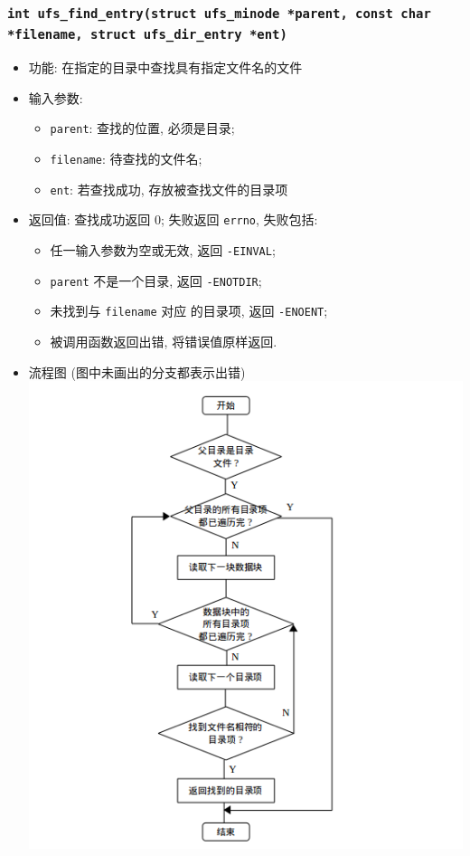 \documentclass[nofonts, titlepage]{ctexart}
\begin{document}
  \subsubsection[\texttt{ufs\_find\_entry}]{\texttt{int ufs\_find\_entry(struct ufs\_minode *parent, const char *filename, struct ufs\_dir\_entry *ent)}}
  \begin{itemize}
\item
  功能: 在指定的目录中查找具有指定文件名的文件
\item
  输入参数:

  \begin{itemize}
  \item
    \texttt{parent}: 查找的位置, 必须是目录;
  \item
    \texttt{filename}: 待查找的文件名;
  \item
    \texttt{ent}: 若查找成功, 存放被查找文件的目录项
  \end{itemize}
\item
  返回值: 查找成功返回 0; 失败返回 \texttt{errno}, 失败包括:

  \begin{itemize}
  \item
    任一输入参数为空或无效, 返回 \texttt{-EINVAL};
  \item
    \texttt{parent} 不是一个目录, 返回 \texttt{-ENOTDIR};
  \item
    未找到与 \texttt{filename} 对应 的目录项, 返回 \texttt{-ENOENT};
  \item
    被调用函数返回出错, 将错误值原样返回.
  \end{itemize}
\item
  流程图 (图中未画出的分支都表示出错)\\
  \includegraphics[width=14cm]{./images/find_entry.png}
  \end{itemize}
\end{document}
